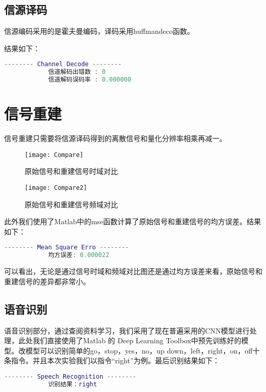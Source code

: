 \documentclass{../source/Experiment}
\begin{document}
        
        \subsection{信源译码}
            信源编码采用的是霍夫曼编码，译码采用huffmandeco函数。
            
            结果如下：
            \begin{lstlisting}[language = matlab]
            -------- Channel Decode --------
            信道解码出错数 : 0
            信道解码误码率 : 0.000000
            \end{lstlisting}

        \section{信号重建}
            信号重建只需要将信源译码得到的离散信号和量化分辨率相乘再减一。
            \begin{figure}[H]
                \centering
                \texttt{[image: Compare]}
                \caption{原始信号和重建信号时域对比}
            \end{figure}
            
            \begin{figure}
                \centering
                \texttt{[image: Compare2]}
                \caption{原始信号和重建信号频域对比}
            \end{figure}

            此外我们使用了Matlab中的mse函数计算了原始信号和重建信号的均方误差。结果如下：
            \begin{lstlisting}[language = matlab]
            -------- Mean Square Erro --------
            均方误差: 0.000022
            \end{lstlisting}

            可以看出，无论是通过信号时域和频域对比图还是通过均方误差来看，原始信号和重建信号的差异都非常小。
        \subsection{语音识别}
            语音识别部分，通过查阅资料学习，我们采用了现在普遍采用的CNN模型进行处理，此处我们直接使用了Matlab 的 Deep Learning Toolbox中预先训练好的模型。改模型可以识别简单的go，stop，yes，no，up down，left，right，on，off十条指令。并且本次实验我们以指令“right”为例。最后识别结果如下：
            \begin{lstlisting}[language = matlab]
            -------- Speech Recognition --------
            识别结果：right
            \end{lstlisting}
\end{document}

